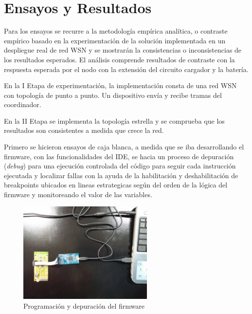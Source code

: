 
\chapter{Ensayos y Resultados} %
\label{Chapter4} 
Para los ensayos se recurre a la metodología empírica analítica, o contraste empírico basado en la experimentación de la solución implementada en un despliegue real de red WSN y se mostrarán la consistencias o inconsistencias de los resultados esperados.
El análisis comprende resultados de contraste con la respuesta esperada por el nodo con la extensión del circuito cargador y la batería.

En la I Etapa de experimentación, la implementación consta de una red WSN con topología de punto a punto. Un dispositivo envía y recibe tramas del coordinador.

En la II Etapa se implementa la topología estrella y se comprueba que los resultados son consistentes a medida que crece la red.

Primero se hicieron ensayos de caja blanca, a medida que se iba desarrollando el firmware, con las funcionalidades del IDE, se hacia un proceso de depuración (\textit{debug}) para una ejecución controlada del código para seguir cada instrucción ejecutada y localizar fallas con la ayuda de la habilitación y deshabilitación de breakpoints ubicados en lineas estrategicas según del orden de la lógica del firmware y monitoreando el valor de las variables.

\begin{figure}[h!]
	\centering
    \includegraphics[width=0.6\textwidth]{./Figures/debu.jpg}
    	\caption{Programación y depuración del firmware}
	\label{fig:debu}
\end{figure}

